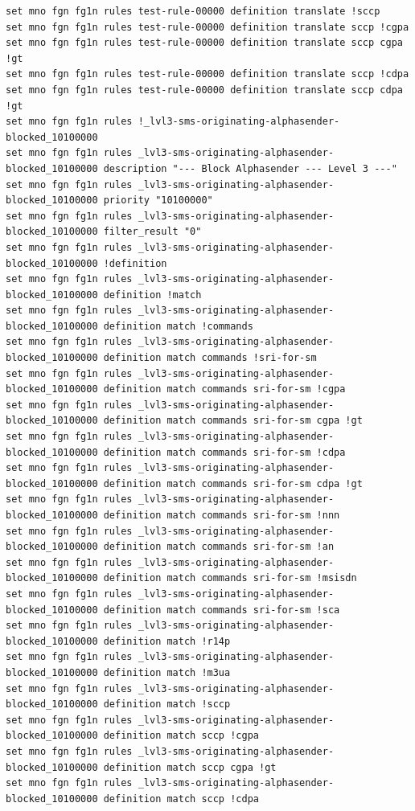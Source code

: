 \documentclass[a4paper,latin]{paper}
\begin{document}
\begin{lstlisting}[style=BashInputStyle]
set mno fgn fg1n rules test-rule-00000 definition translate !sccp
set mno fgn fg1n rules test-rule-00000 definition translate sccp !cgpa
set mno fgn fg1n rules test-rule-00000 definition translate sccp cgpa !gt
set mno fgn fg1n rules test-rule-00000 definition translate sccp !cdpa
set mno fgn fg1n rules test-rule-00000 definition translate sccp cdpa !gt
set mno fgn fg1n rules !_lvl3-sms-originating-alphasender-blocked_10100000
set mno fgn fg1n rules _lvl3-sms-originating-alphasender-blocked_10100000 description "--- Block Alphasender --- Level 3 ---"
set mno fgn fg1n rules _lvl3-sms-originating-alphasender-blocked_10100000 priority "10100000"
set mno fgn fg1n rules _lvl3-sms-originating-alphasender-blocked_10100000 filter_result "0"
set mno fgn fg1n rules _lvl3-sms-originating-alphasender-blocked_10100000 !definition
set mno fgn fg1n rules _lvl3-sms-originating-alphasender-blocked_10100000 definition !match
set mno fgn fg1n rules _lvl3-sms-originating-alphasender-blocked_10100000 definition match !commands
set mno fgn fg1n rules _lvl3-sms-originating-alphasender-blocked_10100000 definition match commands !sri-for-sm
set mno fgn fg1n rules _lvl3-sms-originating-alphasender-blocked_10100000 definition match commands sri-for-sm !cgpa
set mno fgn fg1n rules _lvl3-sms-originating-alphasender-blocked_10100000 definition match commands sri-for-sm cgpa !gt
set mno fgn fg1n rules _lvl3-sms-originating-alphasender-blocked_10100000 definition match commands sri-for-sm !cdpa
set mno fgn fg1n rules _lvl3-sms-originating-alphasender-blocked_10100000 definition match commands sri-for-sm cdpa !gt
set mno fgn fg1n rules _lvl3-sms-originating-alphasender-blocked_10100000 definition match commands sri-for-sm !nnn
set mno fgn fg1n rules _lvl3-sms-originating-alphasender-blocked_10100000 definition match commands sri-for-sm !an
set mno fgn fg1n rules _lvl3-sms-originating-alphasender-blocked_10100000 definition match commands sri-for-sm !msisdn
set mno fgn fg1n rules _lvl3-sms-originating-alphasender-blocked_10100000 definition match commands sri-for-sm !sca
set mno fgn fg1n rules _lvl3-sms-originating-alphasender-blocked_10100000 definition match !r14p
set mno fgn fg1n rules _lvl3-sms-originating-alphasender-blocked_10100000 definition match !m3ua
set mno fgn fg1n rules _lvl3-sms-originating-alphasender-blocked_10100000 definition match !sccp
set mno fgn fg1n rules _lvl3-sms-originating-alphasender-blocked_10100000 definition match sccp !cgpa
set mno fgn fg1n rules _lvl3-sms-originating-alphasender-blocked_10100000 definition match sccp cgpa !gt
set mno fgn fg1n rules _lvl3-sms-originating-alphasender-blocked_10100000 definition match sccp !cdpa

\end{lstlisting}
\end{document}
